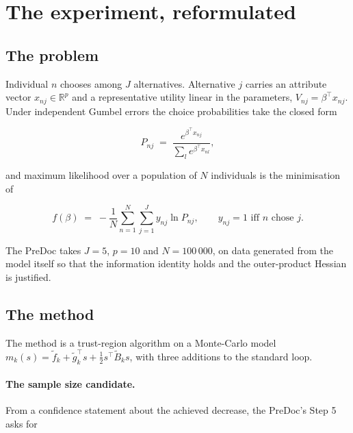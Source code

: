 \documentclass[11pt,a4paper]{article}
\begin{document}
\section{The experiment, reformulated}

\subsection{The problem}

Individual $n$ chooses among $J$ alternatives. Alternative $j$ carries an attribute
vector $x_{nj} \in \mathbb{R}^p$ and a representative utility linear in the
parameters, $V_{nj} = \beta^\top x_{nj}$. Under independent Gumbel errors the
choice probabilities take the closed form

\begin{equation}
  P_{nj} \;=\; \frac{e^{\beta^\top x_{nj}}}{\sum_{l} e^{\beta^\top x_{nl}}},
  \label{eq:logit}
\end{equation}

and maximum likelihood over a population of $N$ individuals is the minimisation of

\begin{equation}
  f(\beta) \;=\; -\frac{1}{N}\sum_{n=1}^{N}\sum_{j=1}^{J} y_{nj}\ln P_{nj},
  \qquad y_{nj} = 1 \text{ iff } n \text{ chose } j.
  \label{eq:objective}
\end{equation}

The PreDoc takes $J = 5$, $p = 10$ and $N = 100\,000$, on data generated from the
model itself so that the information identity holds and the outer-product Hessian
is justified.

\subsection{The method}

The method is a trust-region algorithm on a Monte-Carlo model
$m_k(s) = \tilde f_k + \tilde g_k^\top s + \tfrac12 s^\top \tilde B_k s$, with
three additions to the standard loop.

\paragraph{The sample size candidate.} From a confidence statement about the
achieved decrease, the PreDoc's Step 5 asks for
\end{document}
